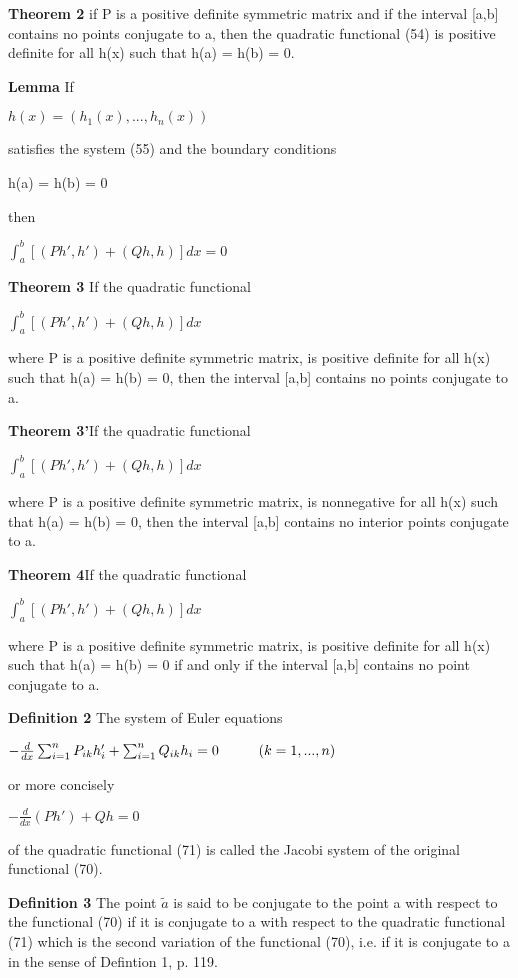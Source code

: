 \documentclass{article}
\newcommand\tab[1][1cm]{\hspace*{#1}}
\begin{document}
\textbf {Theorem 2} if P is a positive definite symmetric matrix and if the interval [a,b] contains no points conjugate to a, then the quadratic functional (54) is positive definite for all h(x) such that h(a) = h(b) = 0.

\textbf {Lemma} If 
\begin{center}
$h(x) = (h_1(x),..., h_n(x))$
\end{center}
satisfies the system (55) and the boundary conditions
\begin{center}
h(a) = h(b) = 0
\end{center}
then 
\begin{center}
$\int_a^b [(Ph', h') + (Qh, h)] dx = 0$
\end{center}

\textbf {Theorem 3} If the quadratic functional
\begin{center}
$\int_a^b [(Ph', h') + (Qh, h)] dx$
\end{center}
where P is a positive definite symmetric matrix, is positive definite for all h(x) such that h(a) = h(b) = 0, then the interval [a,b] contains no points conjugate to a.

\textbf {Theorem 3'}If the quadratic functional
\begin{center}
$\int_a^b [(Ph', h') + (Qh, h)] dx$
\end{center}
where P is a positive definite symmetric matrix, is nonnegative for all h(x) such that h(a) = h(b) = 0, then the interval [a,b] contains no interior points conjugate to a.

\textbf {Theorem 4}If the quadratic functional
\begin{center}
$\int_a^b [(Ph', h') + (Qh, h)] dx$
\end{center}
where P is a positive definite symmetric matrix, is positive definite for all h(x) such that h(a) = h(b) = 0 if and only if the interval [a,b] contains no point conjugate to a.

\textbf {Definition 2} The system of Euler equations
\begin{center}
$-\frac{d}{dx} \sum_{i = 1}^n P_{ik}h'_i + \sum_{i=1}^n Q_{ik} h_i = 0 \tab (k = 1,...,n)$
\end{center}
or more concisely
\begin{center}
$-\frac{d}{dx} (Ph') + Qh = 0$
\end{center}
of the quadratic functional (71) is called the Jacobi system of the original functional (70).

\textbf {Definition 3} The point $\tilde{a}$ is said to be conjugate to the point a with respect to the functional (70) if it is conjugate to a with respect to the quadratic functional (71) which is the second variation of the functional (70), i.e. if it is conjugate to a in the sense of Defintion 1, p. 119.
\end{document}

